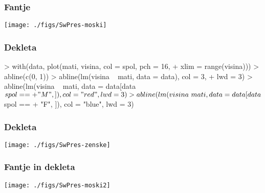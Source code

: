\begin{frame}[fragile]
\frametitle{Fantje}
\texttt{[image: ./figs/SwPres-moski]}
\end{frame}
\clearpage
\begin{frame}[fragile]
\frametitle{Dekleta}
\begin{Schunk}
\begin{Sinput}
> with(data, plot(mati, visina, col = spol, pch = 16, 
+     xlim = range(visina)))
> abline(c(0, 1))
> abline(lm(visina ~ mati, data = data), col = 3, 
+     lwd = 3)
> abline(lm(visina ~ mati, data = data[data$spol == 
+     "M", ]), col = "red", lwd = 3)
> abline(lm(visina ~ mati, data = data[data$spol == 
+     "F", ]), col = "blue", lwd = 3)
\end{Sinput}
\end{Schunk}
\end{frame}

\begin{frame}[fragile]
\frametitle{Dekleta}
\texttt{[image: ./figs/SwPres-zenske]}
\end{frame}
\clearpage
{}
\begin{frame}[fragile]
\frametitle{Fantje in dekleta}
\texttt{[image: ./figs/SwPres-moski2]}
\end{frame}



%
%
\clearpage
